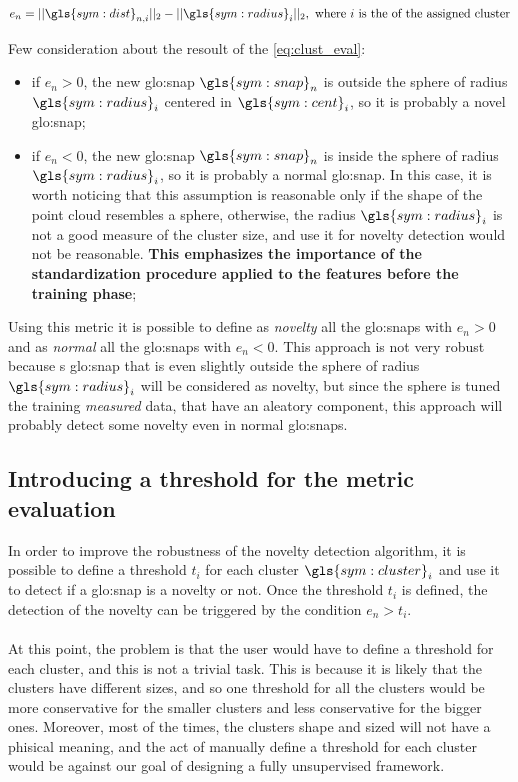 \begin{equation}
  \label{eq:clust_eval}
  e_{n} = ||\gls{sym:dist}_{n,i}||_2 - ||\gls{sym:radius}_{i}||_2, \text{ where $i$ is the of the assigned cluster}
\end{equation}

Few consideration about the resoult of the \autoref{eq:clust_eval}:
\begin{itemize}
  \item if $e_{n} > 0$, the new {\gls{glo:snap}} $\gls{sym:snap}_n$ is outside the sphere of radius $\gls{sym:radius}_i$ centered in $\gls{sym:cent}_i$, so it is probably a novel {\gls{glo:snap}};
  \item if $e_{n} < 0$, the new {\gls{glo:snap}} $\gls{sym:snap}_n$ is inside the sphere of radius $\gls{sym:radius}_i$, so it is probably a normal {\gls{glo:snap}}. In this case, it is worth noticing that this assumption is reasonable only if the shape of the point cloud resembles a sphere, otherwise, the radius $\gls{sym:radius}_i$ is not a good measure of the cluster size, and use it for novelty detection would not be reasonable. \textbf{This emphasizes the importance of the standardization procedure applied to the features before the training phase};
\end{itemize}



Using this metric it is possible to define as \emph{novelty} all the {\gls{glo:snap}}s with $e_{n} > 0$ and as \emph{normal} all the {\gls{glo:snap}}s with $e_{n} < 0$. This approach is not very robust because s {\gls{glo:snap}} that is even slightly outside the sphere of radius $\gls{sym:radius}_i$ will be considered as novelty, but since the sphere is tuned the training \emph{measured} data, that have an aleatory component, this approach will probably detect some novelty even in normal {\gls{glo:snap}}s.

\subsection{Introducing a threshold for the metric evaluation}
\label{sec:clust_threshold}
In order to improve the robustness of the novelty detection algorithm, it is possible to define a threshold ${t}_i$ for each cluster $\gls{sym:cluster}_i$ and use it to detect if a {\gls{glo:snap}} is a novelty or not. Once the threshold ${t}_i$ is defined, the detection of the novelty can be triggered by the condition $e_{n} > {t}_i$.

\paragraph*{}
At this point, the problem is that the user would have to define a threshold for each cluster, and this is not a trivial task. This is because it is likely that the clusters have different sizes, and so one threshold for all the clusters would be more conservative for the smaller clusters and less conservative for the bigger ones. Moreover, most of the times, the clusters shape and sized will not have a phisical meaning, and the act of manually define a threshold for each cluster would be against our goal of designing a fully unsupervised framework.

